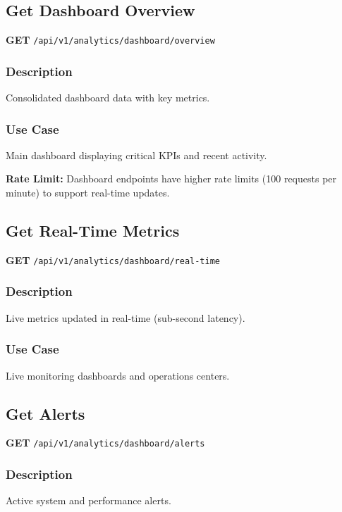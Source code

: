 \documentclass[11pt,a4paper]{report}
\begin{document}
\subsection{Get Dashboard Overview}

\textbf{GET} \texttt{/api/v1/analytics/dashboard/overview}

\subsubsection{Description}
Consolidated dashboard data with key metrics.

\subsubsection{Use Case}
Main dashboard displaying critical KPIs and recent activity.

\begin{infobox}
\textbf{Rate Limit:}
Dashboard endpoints have higher rate limits (100 requests per minute) to support real-time updates.
\end{infobox}

\subsection{Get Real-Time Metrics}

\textbf{GET} \texttt{/api/v1/analytics/dashboard/real-time}

\subsubsection{Description}
Live metrics updated in real-time (sub-second latency).

\subsubsection{Use Case}
Live monitoring dashboards and operations centers.

\subsection{Get Alerts}

\textbf{GET} \texttt{/api/v1/analytics/dashboard/alerts}

\subsubsection{Description}
Active system and performance alerts.
\end{document}

